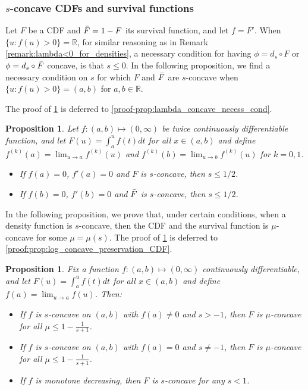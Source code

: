 \documentclass{article} %
\newtheorem{proposition}[theorem]{Proposition}
\begin{document}
\subsubsection{$s$-concave CDFs and survival functions}\label{sec:CDF}
Let $F$ be a CDF and $\Bar{F}=1-F$ its survival function, and let $f = F'$. When $\{u:f(u)>0\}= \mathbb{R}$, for similar reasoning as in Remark \ref{remark:lambda<0_for_densities}, a necessary condition for having $\phi = d_{s} \circ F$ or $\phi = d_{s} \circ \Bar{F}$ concave, is that $s \leq 0$. In the following proposition, we find a necessary condition on $s$ for which $F$ and $\Bar{F}$ are $s$-concave when $\{u: f(u) >0 \}= (a,b)$ for $a,b \in \mathbb{R}$.

The proof of \cref{prop:lambda_concave_necessary_cond} is deferred to \cref{proof-prop:lambda_concave_necess_cond}.

\begin{proposition}\label{prop:lambda_concave_necessary_cond}
Let $f:(a,b)\mapsto (0,\infty)$ be twice continuously differentiable function, and let $F(u) = \int_a^u f(t) dt$ for all $x \in (a,b)$ and define $f^{(k)}(a) = \lim_{u \rightarrow a} f^{(k)}(u)$ and $f^{(k)}(b) = \lim_{u \rightarrow b} f^{(k)}(u)$ for $k=0,1$.

\begin{itemize}
    \item[1)] If $f(a)=0$, $f'(a)=0$ and $F$ is $s$-concave, then $s \leq 1/2$.
    \item[2)] If $f(b)=0$, $f'(b)=0$ and $\Bar{F}$ is $s$-concave, then $s \leq 1/2$.
\end{itemize}
\end{proposition}

\noindent
In the following proposition, we prove that, under certain conditions, when a density function is $s$-concave, then the CDF and the survival function is $\mu$-concave for some $\mu = \mu (s)$. The proof of \cref{prop:log_concave_preservation_CDF} is deferred to \cref{proof:prop:log_concave_preservation_CDF}.

\begin{proposition}\label{prop:log_concave_preservation_CDF}
Fix a function $f:(a,b)\mapsto (0,\infty)$ continuously differentiable, and let $F(u) = \int_a^u f(t) dt$ for all $x \in (a,b)$ and define $f(a) = \lim_{u \rightarrow a} f(u)$. Then:
\begin{itemize}
    \item[1)] If $f$ is $s$-concave on $(a,b)$ with $f(a)\neq 0$ and $s > -1$, then $F$ is $\mu$-concave for all $\mu\leq 1-\frac{1}{s +1}$.
    \item[2)] If $f$ is $s$-concave on $(a,b)$ with $f(a)= 0$ and $s \neq -1$, then $F$ is $\mu$-concave for all $\mu\leq 1-\frac{1}{s +1}$.
    \item[3)] If $f$ is monotone decreasing, then $F$ is $s$-concave for any $s <1$.
\end{itemize}
\end{proposition}
\end{document}
